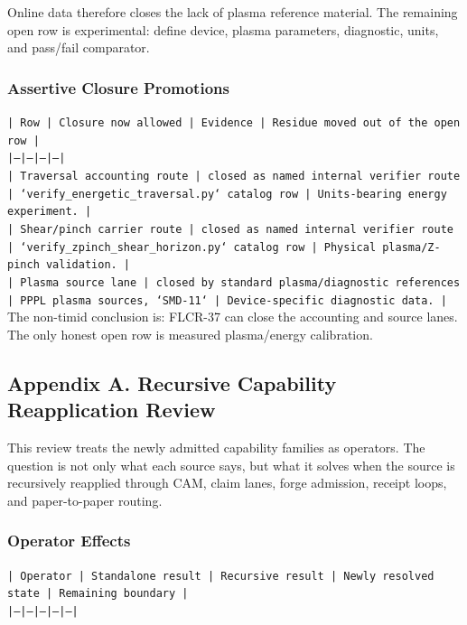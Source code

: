 \documentclass[11pt]{article}
\begin{document}
Online data therefore closes the lack of plasma reference material. The remaining open row is experimental: define device, plasma parameters, diagnostic, units, and pass/fail comparator.

\subsubsection*{Assertive Closure Promotions}

\noindent\texttt{| Row | Closure now allowed | Evidence | Residue moved out of the open row |}\\
\noindent\texttt{|---|---|---|---|}\\
\noindent\texttt{| Traversal accounting route | closed as named internal verifier route | `verify\_energetic\_traversal.py` catalog row | Units-bearing energy experiment. |}\\
\noindent\texttt{| Shear/pinch carrier route | closed as named internal verifier route | `verify\_zpinch\_shear\_horizon.py` catalog row | Physical plasma/Z-pinch validation. |}\\
\noindent\texttt{| Plasma source lane | closed by standard plasma/diagnostic references | PPPL plasma sources, `SMD-11` | Device-specific diagnostic data. |}\\

The non-timid conclusion is: FLCR-37 can close the accounting and source lanes. The only honest open row is measured plasma/energy calibration.

\subsection*{Appendix A. Recursive Capability Reapplication Review}

This review treats the newly admitted capability families as operators. The question is not only what each source says, but what it solves when the source is recursively reapplied through CAM, claim lanes, forge admission, receipt loops, and paper-to-paper routing.

\subsubsection*{Operator Effects}

\noindent\texttt{| Operator | Standalone result | Recursive result | Newly resolved state | Remaining boundary |}\\
\noindent\texttt{|---|---|---|---|---|}\\
\end{document}
